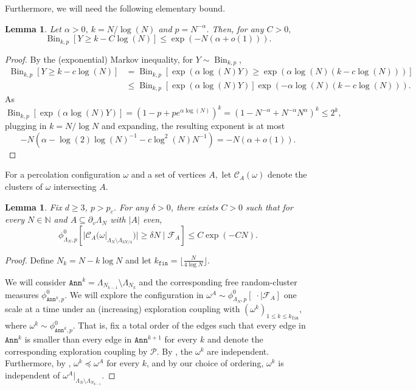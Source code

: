 \documentclass[article,11pt,reqno]{amsart}
\newcommand{\Bin}{\operatorname{Bin}}
\newcommand{\ak}{\mathtt{Ann}^k}
\newtheorem{lemma}[theorem]{Lemma}
\begin{document}
\begin{appendix}
 Furthermore, we will need the following elementary bound.
\begin{lemma} \label{Lemma:Bernoulli_LD}
Let $\alpha>0$, $k=N/\log(N)$ and $p=N^{-\alpha}$. Then, for any $C>0,$ 
$$
\operatorname{Bin}_{k,p}[Y\geq k - C \log(N)]\leq \exp(-N(\alpha+o(1))).
$$
\end{lemma}
\begin{proof}
    By the (exponential) Markov inequality, for $Y \sim \Bin_{k,p}$, 
    \begin{align*}
     \Bin_{k,p}[Y \geq k - c \log(N)] 
     &=   \Bin_{k,p}[\exp(\alpha \log(N)Y)\geq \exp(\alpha \log(N)(k - c \log(N)))] \\ 
     &\leq  \Bin_{k,p}[\exp(\alpha \log(N)Y)] \exp(- \alpha\log(N)(k - c \log(N))). 
    \end{align*}
    As $\Bin_{k,p}[\exp(\alpha \log(N)Y)] = (1-p+pe^{\alpha \log(N)})^k = (1-N^{-\alpha} +N^{-\alpha}N^{\alpha})^k \leq 2^k,$ plugging in $k=N/\log N$ and expanding, the resulting exponent is at most 
    $$
     - N ( \alpha - \log(2)\log(N)^{-1} - c \log^2(N)N^{-1}) = - N( \alpha + o(1)).
    $$
\end{proof}



\noindent For a percolation configuration $\omega$ and a set of vertices $A,$ let $\mathscr{C}_A(\omega)$ denote the clusters of $\omega$ intersecting $A$.

\begin{lemma} \label{The_Catching_Prop}
Fix $d\geq 3$, $p>p_c$. For any $\delta>0$, there exists $C>0$ such that for every $N\in \mathbb{N}$ and $A\subseteq \partial_v\Lambda_N$ with $|A|$ even,
$$
\phi^0_{\Lambda_N,p}[ |\mathscr{C}_A(\omega|_{\Lambda_N\setminus \Lambda_{3N/4}})| \geq   \delta N\mid \mathcal{F}_A]\leq C\exp(-C N).
$$
\end{lemma}
\begin{proof}
Define $N_k=N-k\log N$ and let $k_{\mathtt{fin}}=\lfloor \frac{N}{4\log N}\rfloor$.

We will consider $\mathtt{Ann}^k=\Lambda_{N_{k-1}}\setminus \Lambda_{N_k}$ and the corresponding free random-cluster measures $\phi^0_{\mathtt{Ann}^k,p}.$ %
 We will explore the configuration in $\omega^A\sim \phi^0_{\Lambda_N,p}[\;\cdot\mid \mathcal{F}_A]$ one scale at a time under an (increasing) exploration coupling with $(\omega^k )_{1\leq k\leq k_{\mathtt{fin}}},$ where $\omega^k \sim \phi^0_{\mathtt{Ann}^k,p}$. That is, fix a total order of the edges such that every edge in $\ak$ is smaller than every edge in $\mathtt{Ann}^{k+1}$ for every $k$ and denote the corresponding exploration coupling by $\mathscr{P}$. By , the $\omega^k$ are independent. Furthermore, by ,  $\omega^k\preceq \omega^A$ for every $k$, and by our choice of ordering, $\omega^k$ is independent of $\omega^A|_{\Lambda_N \setminus \Lambda_{N_{k-1}}}.$


\end{proof}
\end{appendix}
\end{document}
